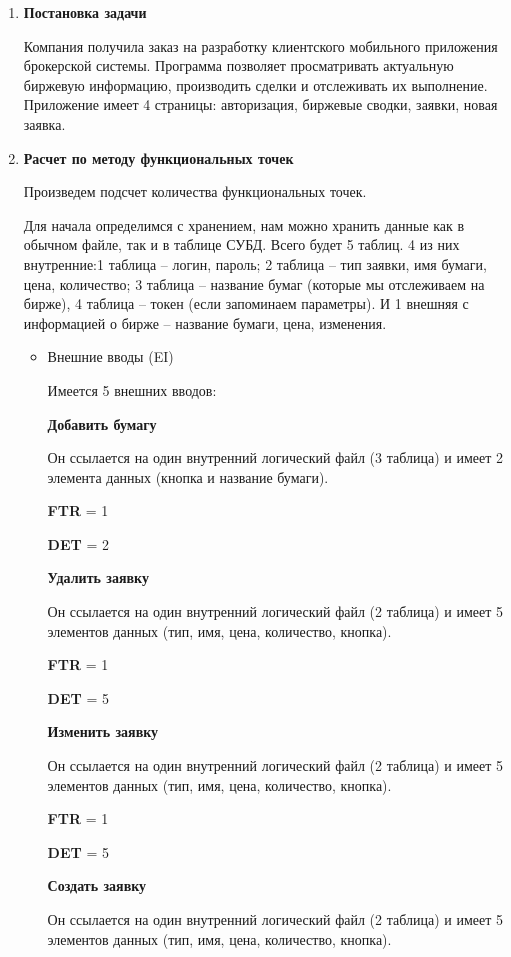 \documentclass[a4paper,14pt]{extreport} %
\begin{document}
\begin{enumerate}

\item \textbf{Постановка задачи}

Компания получила заказ на разработку клиентского мобильного приложения брокерской системы. Программа позволяет просматривать актуальную биржевую информацию, производить сделки и отслеживать их выполнение.
Приложение имеет 4 страницы: авторизация, биржевые сводки, заявки, новая заявка.

\item \textbf{Расчет по методу функциональных точек}

Произведем подсчет количества функциональных точек.

Для начала определимся с хранением, нам можно хранить данные как в обычном файле, так и в таблице СУБД. Всего будет 5 таблиц. 4 из них внутренние:1 таблица -- логин, пароль; 2 таблица -- тип заявки, имя бумаги, цена, количество; 3 таблица -- название бумаг (которые мы отслеживаем на бирже), 4 таблица -- токен (если запоминаем параметры). И 1 внешняя с информацией о бирже -- название бумаги, цена, изменения.

\begin{itemize}

\item Внешние вводы (EI)

Имеется 5 внешних вводов:

\textbf{Добавить бумагу}

Он ссылается на один внутренний логический файл (3 таблица) и имеет 2 элемента данных (кнопка и название бумаги).

\textbf{FTR} = 1

\textbf{DET} = 2

\textbf{Удалить заявку}

Он ссылается на один внутренний логический файл (2 таблица) и имеет 5 элементов данных (тип, имя, цена, количество, кнопка).

\textbf{FTR} = 1

\textbf{DET} = 5

\textbf{Изменить заявку}

Он ссылается на один внутренний логический файл (2 таблица) и имеет 5 элементов данных (тип, имя, цена, количество, кнопка).

\textbf{FTR} = 1

\textbf{DET} = 5

\textbf{Создать заявку}

Он ссылается на один внутренний логический файл (2 таблица) и имеет 5 элементов данных (тип, имя, цена, количество, кнопка).


\end{itemize}
\end{enumerate}
\end{document}
